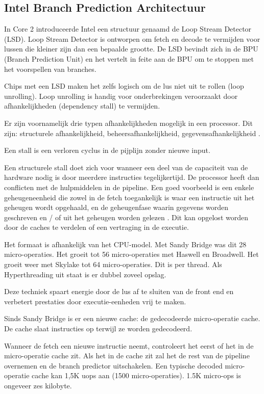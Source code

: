 \subsection{Intel Branch Prediction Architectuur}
In Core 2 introduceerde Intel een structuur genaamd de Loop Stream Detector (LSD).
Loop Stream Detector is ontworpen om fetch en decode te vermijden voor lussen die kleiner zijn dan een bepaalde grootte.
De LSD bevindt zich in de BPU (Branch Prediction Unit) en het vertelt in feite aan de BPU om te stoppen met het voorspellen van branches.

Chips met een LSD maken het zelfs logisch om de lus niet uit te rollen (loop unrolling).
Loop unrolling is handig voor onderbrekingen veroorzaakt door afhankelijkheden (dependency stall) te vermijden.

Er zijn voornamelijk drie typen afhankelijkheden mogelijk in een processor. Dit zijn: structurele afhankelijkheid, beheersafhankelijkheid, gegevensafhankelijkheid \parencite{Hennessy2009}.

Een stall is een verloren cyclus in de pijplijn zonder nieuwe input.

Een structurele stall doet zich voor wanneer een deel van de capaciteit van de hardware nodig is door meerdere instructies tegelijkertijd.
De processor heeft dan conflicten met de hulpmiddelen in de pipeline.
Een goed voorbeeld is een enkele geheugeneenheid die zowel in de fetch toegankelijk is waar een instructie uit het geheugen wordt opgehaald, en de geheugenfase waarin gegevens worden geschreven en / of uit het geheugen worden gelezen \parencite{Hennessy2009}.
Dit kan opgelost worden door de caches te verdelen of een vertraging in de executie.




Het formaat is afhankelijk van het CPU-model.
Met Sandy Bridge was dit 28 micro-operaties. Het groeit tot 56 micro-operaties met Haswell en Broadwell. Het groeit weer met Skylake tot 64 micro-operaties. Dit is per thread.
Als Hyperthreading uit staat is er dubbel zoveel opslag.


Deze techniek spaart energie door de lus af te sluiten van de front end en verbetert prestaties door executie-eenheden vrij te maken.


Sinds Sandy Bridge is er een nieuwe cache: de gedecodeerde micro-operatie cache.
De cache slaat instructies op terwijl ze worden gedecodeerd.

Wanneer de fetch een nieuwe instructie neemt, controleert het eerst of het in de micro-operatie cache zit.
Als het in de cache zit zal het de rest van de pipeline overnemen en de branch predictor uitschakelen.
Een typische decoded micro-operatie cache kan 1,5K uops aan (1500 micro-operaties).
1.5K micro-ops is ongeveer zes kilobyte.

